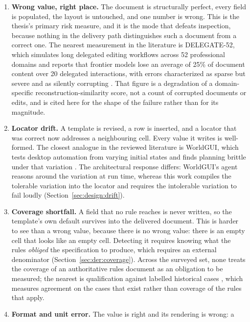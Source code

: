 \begin{enumerate}
  \item \textbf{Wrong value, right place.} The document is structurally perfect, every field
    is populated, the layout is untouched, and one number is wrong. This is the thesis's
    primary risk measure, and it is the mode that defeats inspection, because nothing in the
    delivery path distinguishes such a document from a correct one. The nearest measurement in
    the literature is DELEGATE-52, which simulates long delegated editing workflows across 52
    professional domains and reports that frontier models lose an average of 25\% of document
    content over 20 delegated interactions, with errors characterized as sparse but severe and
    as silently corrupting \cite{laban2026delegate}. That figure is a degradation of a
    domain-specific reconstruction-similarity score, not a count of corrupted documents or
    edits, and is cited here for the shape of the failure rather than for its magnitude.
  \item \textbf{Locator drift.} A template is revised, a row is inserted, and a locator that
    was correct now addresses a neighbouring cell. Every value it writes is well-formed. The
    closest analogue in the reviewed literature is WorldGUI, which tests desktop automation
    from varying initial states and finds planning brittle under that variation
    \cite{zhao2025worldgui}. The architectural response differs: WorldGUI's agent reasons around
    the variation at run time, whereas this work compiles the tolerable variation into the
    locator and requires the intolerable variation to fail loudly
    (Section~\ref{sec:design:drift}).
  \item \textbf{Coverage shortfall.} A field that no rule reaches is never written, so the
    template's own default survives into the delivered document. This is harder to see than a
    wrong value, because there is no wrong value: there is an empty cell that looks like an
    empty cell. Detecting it requires knowing what the rules \emph{obliged} the specification
    to produce, which requires an external denominator (Section~\ref{sec:der:coverage}).
    Across the surveyed set, none treats the coverage of an authoritative rules document
    as an obligation to be measured; the nearest is qualification against labelled historical
    cases \cite{kujanpaa2026toolmaking}, which measures agreement on the cases that exist
    rather than coverage of the rules that apply.
  \item \textbf{Format and unit error.} The value is right and its rendering is wrong: a

\end{enumerate}
